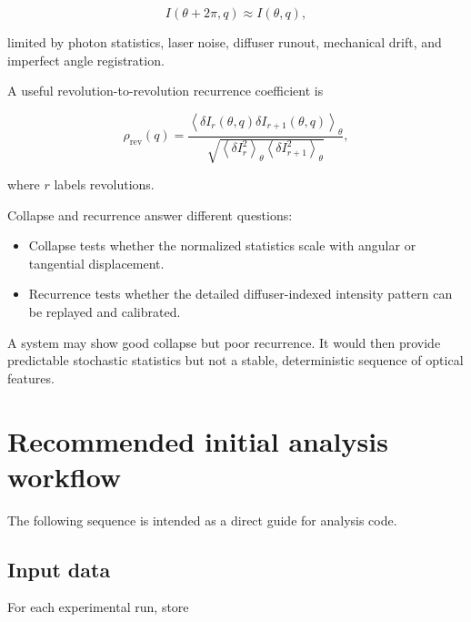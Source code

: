 \documentclass[11pt,letterpaper]{article}
\newcommand{\avg}[1]{\left\langle #1 \right\rangle}
\begin{document}
\begin{equation}
    I(\theta+2\pi,q)\approx I(\theta,q),
\end{equation}

limited by photon statistics, laser noise, diffuser runout, mechanical drift,
and imperfect angle registration.

A useful revolution-to-revolution recurrence coefficient is

\begin{equation}
    \rho_{\mathrm{rev}}(q)
    =
    \frac{
    \avg{
    \delta I_r(\theta,q)
    \delta I_{r+1}(\theta,q)
    }_\theta
    }{
    \sqrt{
    \avg{\delta I_r^2}_\theta
    \avg{\delta I_{r+1}^2}_\theta
    }
    },
    \label{eq:rev_correlation}
\end{equation}

where $r$ labels revolutions.

Collapse and recurrence answer different questions:

\begin{itemize}[leftmargin=2em]
    \item Collapse tests whether the normalized statistics scale with
    angular or tangential displacement.
    \item Recurrence tests whether the detailed diffuser-indexed intensity
    pattern can be replayed and calibrated.
\end{itemize}

A system may show good collapse but poor recurrence. It would then provide
predictable stochastic statistics but not a stable, deterministic sequence
of optical features.

\section{Recommended initial analysis workflow}

The following sequence is intended as a direct guide for analysis code.

\subsection{Input data}

For each experimental run, store
\end{document}
